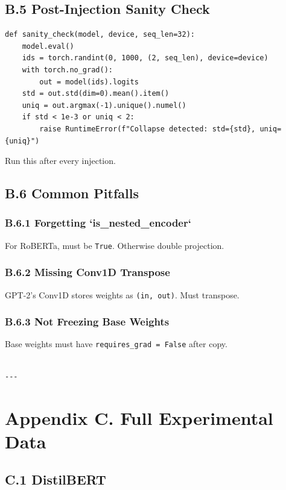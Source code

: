 \subsection{B.5 Post-Injection Sanity Check}

\begin{lstlisting}
def sanity_check(model, device, seq_len=32):
    model.eval()
    ids = torch.randint(0, 1000, (2, seq_len), device=device)
    with torch.no_grad():
        out = model(ids).logits
    std = out.std(dim=0).mean().item()
    uniq = out.argmax(-1).unique().numel()
    if std < 1e-3 or uniq < 2:
        raise RuntimeError(f"Collapse detected: std={std}, uniq={uniq}")
\end{lstlisting}

Run this after every injection.

\subsection{B.6 Common Pitfalls}

\subsubsection{B.6.1 Forgetting `is\_nested\_encoder`}

For RoBERTa, must be \texttt{True}. Otherwise double projection.

\subsubsection{B.6.2 Missing Conv1D Transpose}

GPT-2's Conv1D stores weights as \texttt{(in, out)}. Must transpose.

\subsubsection{B.6.3 Not Freezing Base Weights}

Base weights must have \texttt{requires\_grad = False} after copy.
\begin{lstlisting}

---
\end{lstlisting}


\section{Appendix C. Full Experimental Data}

\subsection{C.1 DistilBERT}

